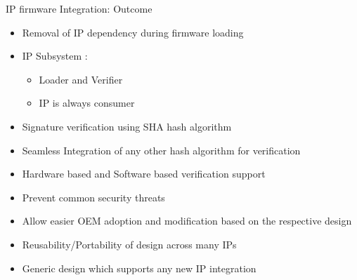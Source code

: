 \begin{frame}{IP firmware Integration: Outcome}
    \begin{itemize}
        \item Removal of IP dependency during firmware loading
        \item IP Subsystem :
        \begin{itemize}
            \item Loader and Verifier
            \item IP is always consumer
        \end{itemize}
        \item Signature verification using SHA hash algorithm
        \item Seamless Integration of any other hash algorithm for verification
        \item Hardware based and Software based verification support
        \item Prevent common security threats
        \item Allow easier OEM adoption and modification based on the respective design
        \item Reusability/Portability of design across many IPs
        \item Generic design which supports any new IP integration
    \end{itemize}
\end{frame}